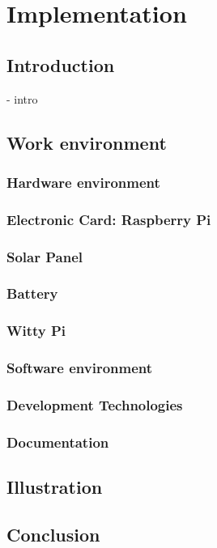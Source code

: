 

\chapter{Implementation}



\section{Introduction}
- intro

\section{Work environment}
    \subsection{Hardware environment}
        \subsection{Electronic Card: Raspberry Pi}
        \subsection{Solar Panel}
        \subsection{Battery}
        \subsection{Witty Pi}
    \subsection{Software environment}
        \subsection{Development Technologies}
        \subsection{Documentation}

\section{Illustration}

\section{Conclusion}

